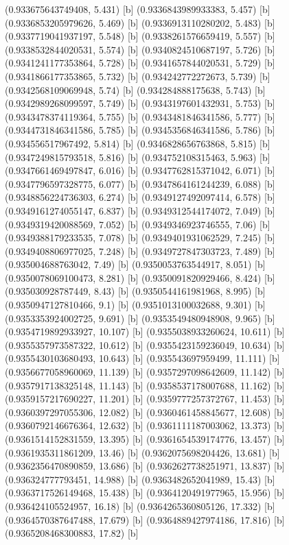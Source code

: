 {{{(0.933675643749408, 5.431) [b] 
(0.9336843989933383, 5.457) [b] 
(0.9336853205979626, 5.469) [b] 
(0.9336913110280202, 5.483) [b] 
(0.9337719041937197, 5.548) [b] 
(0.9338261576659419, 5.557) [b] 
(0.9338532844020531, 5.574) [b] 
(0.9340824510687197, 5.726) [b] 
(0.9341241177353864, 5.728) [b] 
(0.9341657844020531, 5.729) [b] 
(0.9341866177353865, 5.732) [b] 
(0.934242772272673, 5.739) [b] 
(0.9342568109069948, 5.74) [b] 
(0.934284888175638, 5.743) [b] 
(0.9342989268099597, 5.749) [b] 
(0.9343197601432931, 5.753) [b] 
(0.9343478374119364, 5.755) [b] 
(0.9343481846341586, 5.777) [b] 
(0.9344731846341586, 5.785) [b] 
(0.9345356846341586, 5.786) [b] 
(0.934556517967492, 5.814) [b] 
(0.9346828656763868, 5.815) [b] 
(0.9347249815793518, 5.816) [b] 
(0.934752108315463, 5.963) [b] 
(0.9347661469497847, 6.016) [b] 
(0.9347762815371042, 6.071) [b] 
(0.9347796597328775, 6.077) [b] 
(0.9347864161244239, 6.088) [b] 
(0.9348856224736303, 6.274) [b] 
(0.9349127492097414, 6.578) [b] 
(0.9349161274055147, 6.837) [b] 
(0.9349312544174072, 7.049) [b] 
(0.9349319420088569, 7.052) [b] 
(0.9349346923746555, 7.06) [b] 
(0.9349388179233535, 7.078) [b] 
(0.9349401931062529, 7.245) [b] 
(0.9349408806977025, 7.248) [b] 
(0.9349727847303723, 7.489) [b] 
(0.935004688763042, 7.49) [b] 
(0.9350053763544917, 8.051) [b] 
(0.9350078069100473, 8.281) [b] 
(0.9350091820929466, 8.424) [b] 
(0.935030928787449, 8.43) [b] 
(0.9350544161981968, 8.995) [b] 
(0.9350947127810466, 9.1) [b] 
(0.9351013100032688, 9.301) [b] 
(0.9353353924002725, 9.691) [b] 
(0.9353549480948908, 9.965) [b] 
(0.9354719892933927, 10.107) [b] 
(0.9355038933260624, 10.611) [b] 
(0.9355357973587322, 10.612) [b] 
(0.9355423159236049, 10.634) [b] 
(0.9355430103680493, 10.643) [b] 
(0.935543697959499, 11.111) [b] 
(0.9356677058960069, 11.139) [b] 
(0.9357297098642609, 11.142) [b] 
(0.9357917138325148, 11.143) [b] 
(0.9358537178007688, 11.162) [b] 
(0.9359157217690227, 11.201) [b] 
(0.9359777257372767, 11.453) [b] 
(0.9360397297055306, 12.082) [b] 
(0.9360461458845677, 12.608) [b] 
(0.9360792146676364, 12.632) [b] 
(0.9361111187003062, 13.373) [b] 
(0.9361514152831559, 13.395) [b] 
(0.9361654539174776, 13.457) [b] 
(0.9361935311861209, 13.46) [b] 
(0.9362075698204426, 13.681) [b] 
(0.9362356470890859, 13.686) [b] 
(0.9362627738251971, 13.837) [b] 
(0.936324777793451, 14.988) [b] 
(0.9363482652041989, 15.43) [b] 
(0.9363717526149468, 15.438) [b] 
(0.9364120491977965, 15.956) [b] 
(0.936424105524957, 16.18) [b] 
(0.9364265360805126, 17.332) [b] 
(0.9364570387647488, 17.679) [b] 
(0.9364889427974186, 17.816) [b] 
(0.9365208468300883, 17.82) [b] 
}}}
